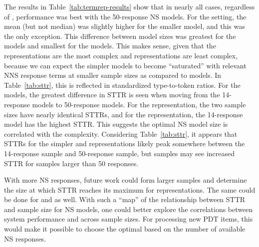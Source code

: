 The results in Table~\ref{tab:termrep-results} show that in nearly all cases, regardless of , performance was best with the 50-response NS models. For the  setting, the mean (but not median) was slightly higher for the smaller model, and this was the only exception. This difference between model sizes was greatest for the  models and smallest for the  models. This makes sense, given that the  representations are the most complex and  representations are least complex, because we can expect the simpler  models to become ``saturated'' with relevant NNS response terms at smaller sample sizes as compared to  models. In Table~\ref{tab:sttr}, this is reflected in standardized type-to-token ratios. For the  models, the greatest difference in STTR is seen when moving from the  14-response models to 50-response models. For the  representation, the two sample sizes have nearly identical STTRs, and for the  representation, the 14-response model has the highest STTR. This suggests the optimal NS model size is correlated with the complexity. Considering Table~\ref{tab:sttr}, it appears that STTRs for the simpler  and   representations likely peak somewhere between the 14-response sample and 50-response sample, but  samples may see increased STTR for samples larger than 50 responses.

With more NS responses, future work could form larger samples and determine the size at which STTR reaches its maximum for  representations. The same could be done for  and   as well. With such a ``map'' of the relationship between STTR and sample size for NS models, one could better explore the correlations between system performance and  across sample sizes. For processing new PDT items, this would make it possible to choose the optimal  based on the number of available NS responses.



